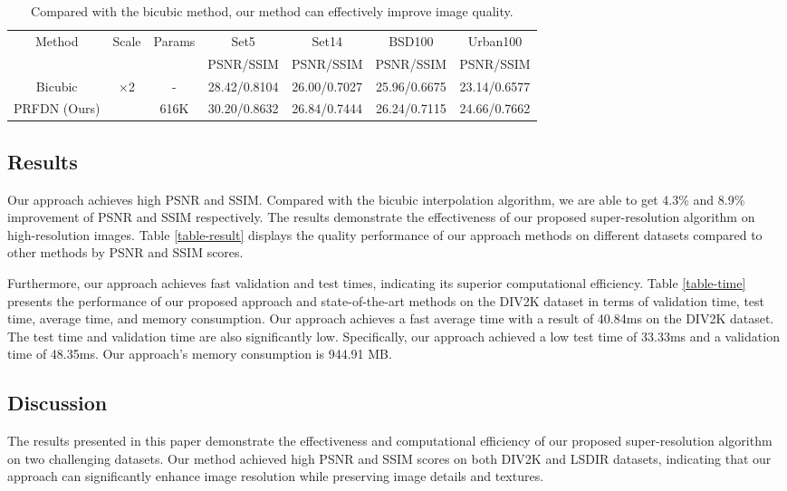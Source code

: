\documentclass[10pt,twocolumn,letterpaper]{article}
\begin{document}
\begin{table}[t]
    \caption{Compared with the bicubic method, our method can effectively improve image quality.}
    \resizebox{\columnwidth}{!}
    {
        \begin{tabular}{|c|c|c|c|c|c|c|}
        \hline
        \multirow{2}{*}{Method} & \multirow{2}{*}{Scale} & \multirow{2}{*}{Params} & Set5  & Set14 & BSD100 & Urban100  \bigstrut\\
    \cline{4-7}          &       &       & PSNR/SSIM & PSNR/SSIM & PSNR/SSIM & PSNR/SSIM  \\
        \hline
        Bicubic & \multirow{2}[2]{*}{×2} & -     & 28.42/0.8104 & 26.00/0.7027 & 25.96/0.6675 & 23.14/0.6577  \\
        PRFDN (Ours) &       & 616K  & 30.20/0.8632 & 26.84/0.7444 & 26.24/0.7115 & 24.66/0.7662 \\
        \hline
        \end{tabular}%
    }
    \label{tab-quality}
\end{table}%
\subsection{Results}
Our approach achieves high PSNR and SSIM. Compared with the bicubic interpolation algorithm, we are able to get 4.3\% and 8.9\% improvement of PSNR and SSIM respectively. The results demonstrate the effectiveness of our proposed super-resolution algorithm on high-resolution images. Table \ref{table-result} displays the quality performance of our approach methods on different datasets compared to other methods by PSNR and SSIM scores.

Furthermore, our approach achieves fast validation and test times, indicating its superior computational efficiency. Table \ref{table-time} presents the performance of our proposed approach and state-of-the-art methods on the DIV2K dataset in terms of validation time, test time, average time, and memory consumption. Our approach achieves a fast average time with a result of 40.84ms on the DIV2K dataset. The test time and validation time are also significantly low. Specifically, our approach achieved a low test time of 33.33ms and a validation time of 48.35ms. Our approach's memory consumption is 944.91 MB.


\subsection{Discussion}
The results presented in this paper demonstrate the effectiveness and computational efficiency of our proposed super-resolution algorithm on two challenging datasets. Our method achieved high PSNR and SSIM scores on both DIV2K and LSDIR datasets, indicating that our approach can significantly enhance image resolution while preserving image details and textures.
\end{document}
